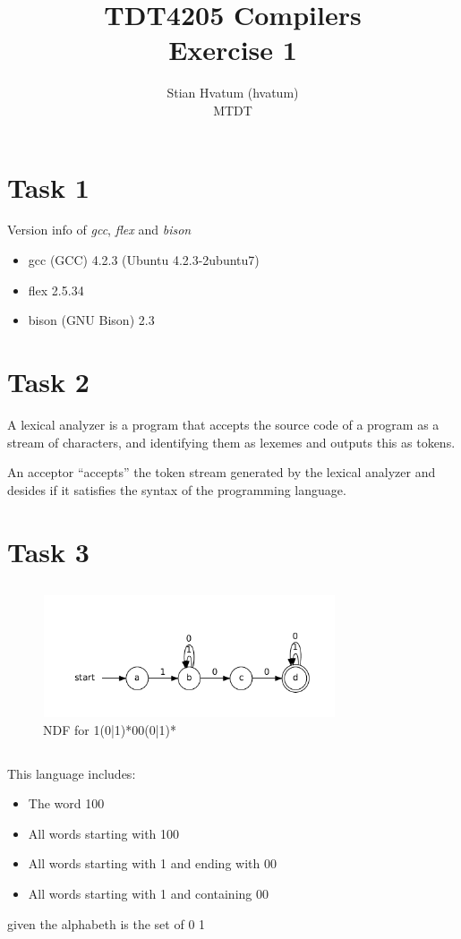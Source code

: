 \documentclass{article}
\title{TDT4205 Compilers\\
\Huge Exercise 1}
\author{Stian Hvatum (hvatum)\\MTDT}
\begin{document}
\maketitle

\section{Task 1}
Version info of \emph{gcc}, \emph{flex} and \emph{bison}
\begin{itemize}
  \item gcc (GCC) 4.2.3 (Ubuntu 4.2.3-2ubuntu7)
  \item flex 2.5.34
  \item bison (GNU Bison) 2.3
\end{itemize}


\section{Task 2}
A lexical analyzer is a program that accepts the source code of a program as a
stream of characters, and identifying them as lexemes and outputs this as
tokens.

An acceptor ``accepts'' the token stream generated by the lexical analyzer
and desides if it satisfies the syntax of the programming language.
\newpage
\section{Task 3}
\subsection{}
\begin{figure}[h]
\includegraphics[width=327px, height=136px]{NDFA31.pdf}
\caption{NDF for 1(0|1)*00(0|1)*}
\end{figure}

\subsection{}
This language includes:
\begin{itemize}
  \item The word 100
  \item All words starting with 100
  \item All words starting with 1 and ending with 00
  \item All words starting with 1 and containing 00
\end{itemize}
given the alphabeth is the set of {0 1}
\end{document}
